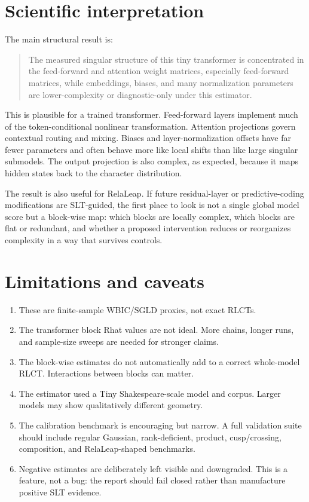 \documentclass[11pt]{article}
\begin{document}
\section{Scientific interpretation}

The main structural result is:

\begin{quote}
The measured singular structure of this tiny transformer is concentrated in the
feed-forward and attention weight matrices, especially feed-forward matrices,
while embeddings, biases, and many normalization parameters are lower-complexity
or diagnostic-only under this estimator.
\end{quote}

This is plausible for a trained transformer. Feed-forward layers implement much
of the token-conditional nonlinear transformation. Attention projections govern
contextual routing and mixing. Biases and layer-normalization offsets have far
fewer parameters and often behave more like local shifts than like large
singular submodels. The output projection is also complex, as expected, because
it maps hidden states back to the character distribution.

The result is also useful for RelaLeap. If future residual-layer or
predictive-coding modifications are SLT-guided, the first place to look is not a
single global model score but a block-wise map: which blocks are locally complex,
which blocks are flat or redundant, and whether a proposed intervention reduces
or reorganizes complexity in a way that survives controls.

\section{Limitations and caveats}

\begin{enumerate}[leftmargin=*]
\item These are finite-sample WBIC/SGLD proxies, not exact RLCTs.
\item The transformer block Rhat values are not ideal. More chains, longer runs,
and sample-size sweeps are needed for stronger claims.
\item The block-wise estimates do not automatically add to a correct whole-model
RLCT. Interactions between blocks can matter.
\item The estimator used a Tiny Shakespeare-scale model and corpus. Larger
models may show qualitatively different geometry.
\item The calibration benchmark is encouraging but narrow. A full validation
suite should include regular Gaussian, rank-deficient, product, cusp/crossing,
composition, and RelaLeap-shaped benchmarks.
\item Negative estimates are deliberately left visible and downgraded. This is a
feature, not a bug: the report should fail closed rather than manufacture
positive SLT evidence.
\end{enumerate}
\end{document}
